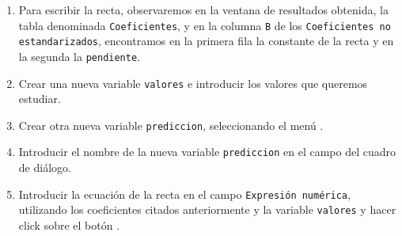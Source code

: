 \begin{enumerate}[leftmargin=*]
\begin{enumerate}
\begin{indicacion}
{\begin{enumerate}
\item Para escribir la recta, observaremos en la ventana de
resultados obtenida, la tabla denominada \texttt{Coeficientes}, y
en la columna \texttt{B} de los \texttt{Coeficientes no
estandarizados}, encontramos en la primera fila la
\textsf{constante} de la recta y en la segunda la
\texttt{pendiente}.

\item Crear una nueva variable \texttt{valores} e introducir los
valores que queremos estudiar.

\item Crear otra nueva variable \texttt{prediccion}, seleccionando
el  menú .

\item  Introducir el nombre de la nueva variable
\texttt{prediccion} en el campo  del
cuadro de diálogo.

\item Introducir la ecuación de la recta en el campo
\texttt{Expresión numérica}, utilizando los coeficientes citados
anteriormente  y la variable \texttt{valores} y hacer click sobre
el botón .

\end{enumerate}}
\end{indicacion}



\end{enumerate}

\end{enumerate}


